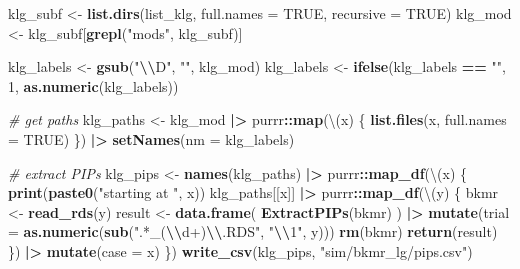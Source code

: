 \documentclass[12pt, twoside]{amherstthesis}
\newenvironment{Shaded}{\begin{snugshade}}{\end{snugshade}}
\newcommand{\AttributeTok}[1]{\textcolor[rgb]{0.13,0.29,0.53}{#1}}
\newcommand{\CommentTok}[1]{\textcolor[rgb]{0.56,0.35,0.01}{\textit{#1}}}
\newcommand{\ConstantTok}[1]{\textcolor[rgb]{0.56,0.35,0.01}{#1}}
\newcommand{\DecValTok}[1]{\textcolor[rgb]{0.00,0.00,0.81}{#1}}
\newcommand{\FunctionTok}[1]{\textcolor[rgb]{0.13,0.29,0.53}{\textbf{#1}}}
\newcommand{\NormalTok}[1]{#1}
\newcommand{\OtherTok}[1]{\textcolor[rgb]{0.56,0.35,0.01}{#1}}
\newcommand{\SpecialCharTok}[1]{\textcolor[rgb]{0.81,0.36,0.00}{\textbf{#1}}}
\newcommand{\StringTok}[1]{\textcolor[rgb]{0.31,0.60,0.02}{#1}}
\begin{document}
\begin{Shaded}
\begin{Highlighting}[]
\NormalTok{klg\_subf }\OtherTok{\textless{}{-}} \FunctionTok{list.dirs}\NormalTok{(list\_klg, }\AttributeTok{full.names =} \ConstantTok{TRUE}\NormalTok{, }\AttributeTok{recursive =} \ConstantTok{TRUE}\NormalTok{)}
\NormalTok{klg\_mod }\OtherTok{\textless{}{-}}\NormalTok{ klg\_subf[}\FunctionTok{grepl}\NormalTok{(}\StringTok{"mods"}\NormalTok{, klg\_subf)]}

\NormalTok{klg\_labels }\OtherTok{\textless{}{-}} \FunctionTok{gsub}\NormalTok{(}\StringTok{"}\SpecialCharTok{\textbackslash{}\textbackslash{}}\StringTok{D"}\NormalTok{, }\StringTok{""}\NormalTok{, klg\_mod)}
\NormalTok{klg\_labels }\OtherTok{\textless{}{-}} \FunctionTok{ifelse}\NormalTok{(klg\_labels }\SpecialCharTok{==} \StringTok{""}\NormalTok{, }\DecValTok{1}\NormalTok{, }\FunctionTok{as.numeric}\NormalTok{(klg\_labels))}

\CommentTok{\# get paths}
\NormalTok{klg\_paths }\OtherTok{\textless{}{-}}\NormalTok{ klg\_mod }\SpecialCharTok{|\textgreater{}} 
\NormalTok{  purrr}\SpecialCharTok{::}\FunctionTok{map}\NormalTok{(\textbackslash{}(x) \{}
    \FunctionTok{list.files}\NormalTok{(x, }\AttributeTok{full.names =} \ConstantTok{TRUE}\NormalTok{)}
\NormalTok{  \}) }\SpecialCharTok{|\textgreater{}} 
  \FunctionTok{setNames}\NormalTok{(}\AttributeTok{nm =}\NormalTok{ klg\_labels)}

\CommentTok{\# extract PIP\textquotesingle{}s}
\NormalTok{klg\_pips }\OtherTok{\textless{}{-}} \FunctionTok{names}\NormalTok{(klg\_paths) }\SpecialCharTok{|\textgreater{}} 
\NormalTok{  purrr}\SpecialCharTok{::}\FunctionTok{map\_df}\NormalTok{(\textbackslash{}(x) \{}
    \FunctionTok{print}\NormalTok{(}\FunctionTok{paste0}\NormalTok{(}\StringTok{"starting at "}\NormalTok{, x))}
\NormalTok{    klg\_paths[[x]] }\SpecialCharTok{|\textgreater{}} 
\NormalTok{      purrr}\SpecialCharTok{::}\FunctionTok{map\_df}\NormalTok{(\textbackslash{}(y) \{}
\NormalTok{        bkmr }\OtherTok{\textless{}{-}} \FunctionTok{read\_rds}\NormalTok{(y)}
\NormalTok{        result }\OtherTok{\textless{}{-}} \FunctionTok{data.frame}\NormalTok{(}
          \FunctionTok{ExtractPIPs}\NormalTok{(bkmr)}
\NormalTok{        ) }\SpecialCharTok{|\textgreater{}} 
          \FunctionTok{mutate}\NormalTok{(}\AttributeTok{trial =} \FunctionTok{as.numeric}\NormalTok{(}\FunctionTok{sub}\NormalTok{(}\StringTok{".*\_(}\SpecialCharTok{\textbackslash{}\textbackslash{}}\StringTok{d+)}\SpecialCharTok{\textbackslash{}\textbackslash{}}\StringTok{.RDS"}\NormalTok{, }\StringTok{"}\SpecialCharTok{\textbackslash{}\textbackslash{}}\StringTok{1"}\NormalTok{, y)))}
        \FunctionTok{rm}\NormalTok{(bkmr)}
        \FunctionTok{return}\NormalTok{(result)}
\NormalTok{      \}) }\SpecialCharTok{|\textgreater{}} 
      \FunctionTok{mutate}\NormalTok{(}\AttributeTok{case =}\NormalTok{ x)}
\NormalTok{  \})}
\FunctionTok{write\_csv}\NormalTok{(klg\_pips, }\StringTok{"sim/bkmr\_lg/pips.csv"}\NormalTok{)}


\end{Highlighting}
\end{Shaded}
\end{document}
